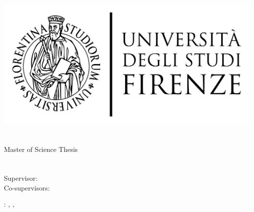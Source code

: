 \begin{titlepage}
	\begin{center}
   	\large
      \hfill
      \vfill
      \begingroup
      \includegraphics[scale=0.15]{static/logo/LOGO}\\
			\myFaculty \\
			\myDegree \\ 
			\vspace{0.5cm}
         \vspace{0.5cm}    
         Master of Science Thesis    
      \endgroup 
      \vfill 
      \begingroup
      	\color{Maroon}\spacedallcaps{\myEnglishTitle} \\ $\ $\\
      	\spacedallcaps{\myItalianTitle} \\ 	
	\bigskip
      \endgroup
      \spacedlowsmallcaps{\myName}
      \vfill 
      \vfill
      Supervisor: \emph{\mySupervisor}\\
      Co-supervisors: \emph{\myOtherProf}\\
      \vfill
      \vfill
      \myTime
      \vfill                      
	\end{center}        
\end{titlepage}   
   \newpage
	\thispagestyle{empty}
	\hfill
	\vfill
	\noindent\myName: 
	\textit{\myEnglishTitle,} 
	\myDegree, \textcopyright\ \myTime

